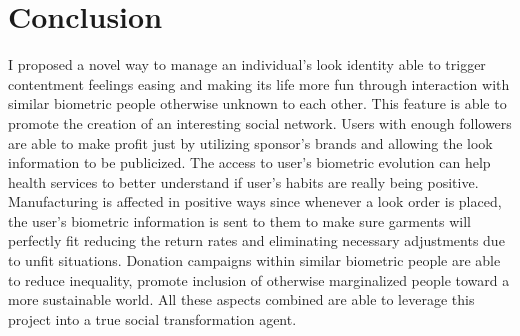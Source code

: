 \documentclass[twoside,twocolumn]{article}
\begin{document}
\section{Conclusion}

I proposed a novel way to manage an individual's look identity able to trigger
contentment feelings easing and making its life more fun through interaction
with similar biometric people otherwise unknown to each other. This feature is
able to promote the creation of an interesting social network.
Users with enough followers are able to make profit just by utilizing sponsor's
brands and allowing the look information to be publicized.
The access to user's biometric evolution can help health services to better
understand if user's habits are really being positive.
Manufacturing is affected in positive ways since whenever a look order is
placed, the user's biometric information is sent to them to make sure garments
will perfectly fit reducing the return rates and eliminating necessary
adjustments due to unfit situations.
Donation campaigns within similar biometric people are able to reduce
inequality, promote inclusion of otherwise marginalized people toward a more
sustainable world.
All these aspects combined are able to leverage this project into a true social
transformation agent.




\end{document}
